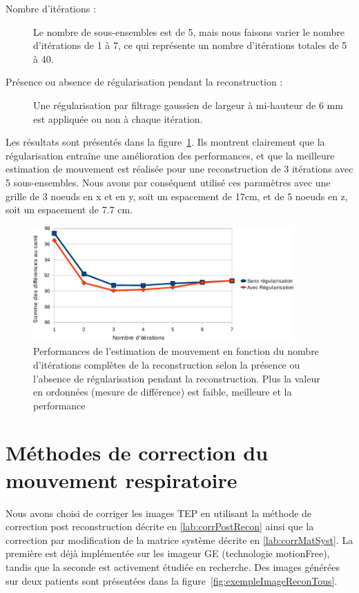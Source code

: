 \begin{description}
 \item[Nombre d'itérations :] Le nombre de sous-ensembles est de 5, mais nous faisons varier le nombre d'itérations de 1 à 7, ce qui représente un nombre d'itérations totales de 5 à 40.
 \item[Présence ou absence de régularisation pendant la reconstruction :] Une régularisation par filtrage gaussien de largeur à mi-hauteur de 6 mm est appliquée ou non à chaque itération.
\end{description}

Les résultats sont présentés dans la figure~\ref{lab:perfsFctIterReg}. Ils montrent clairement que la régularisation entraîne une amélioration des performances, et que la meilleure estimation de mouvement est réalisée pour une reconstruction de 3 itérations avec 5 sous-ensembles. Nous avons par conséquent utilisé ces paramètres avec une grille de 3 noeuds en x et en y, soit un espacement de 17cm, et de 5 noeuds en z, soit un espacement de 7.7 cm.

\begin{figure}
\centering
\includegraphics[width=10cm]{images/perfsRecalageFctIter_crop}
\caption[Performances de l'estimation de mouvement en fonction de la régularisation]{Performances de l'estimation de mouvement en fonction du nombre d'itérations complètes de la reconstruction selon la présence ou l'absence de régularisation pendant la reconstruction. Plus la valeur en ordonnées (mesure de différence) est faible, meilleure et la performance}
\label{lab:perfsFctIterReg}
\end{figure}


\section{Méthodes de correction du mouvement respiratoire}

Nous avons choisi de corriger les images TEP en utilisant la méthode de correction post reconstruction décrite en \ref{lab:corrPostRecon} ainsi que la correction par modification de la matrice système décrite en \ref{lab:corrMatSyst}. La première est déjà implémentée sur les imageur GE (technologie motionFree), tandis que la seconde est activement étudiée en recherche. Des images générées sur deux patients sont présentées dans la figure~\ref{fig:exempleImageReconTous}.

